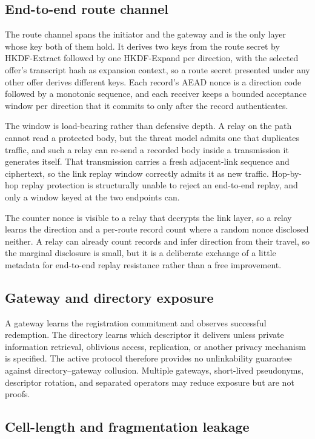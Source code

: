 \documentclass[11pt,oneside]{article}
\begin{document}
\subsection{End-to-end route channel}

The route channel spans the initiator and the gateway and is the only layer whose key both of them hold. It derives two keys from the route secret by HKDF-Extract followed by one HKDF-Expand per direction, with the selected offer's transcript hash as expansion context, so a route secret presented under any other offer derives different keys. Each record's AEAD nonce is a direction code followed by a monotonic sequence, and each receiver keeps a bounded acceptance window per direction that it commits to only after the record authenticates.

The window is load-bearing rather than defensive depth. A relay on the path cannot read a protected body, but the threat model admits one that duplicates traffic, and such a relay can re-send a recorded body inside a transmission it generates itself. That transmission carries a fresh adjacent-link sequence and ciphertext, so the link replay window correctly admits it as new traffic. Hop-by-hop replay protection is structurally unable to reject an end-to-end replay, and only a window keyed at the two endpoints can.

The counter nonce is visible to a relay that decrypts the link layer, so a relay learns the direction and a per-route record count where a random nonce disclosed neither. A relay can already count records and infer direction from their travel, so the marginal disclosure is small, but it is a deliberate exchange of a little metadata for end-to-end replay resistance rather than a free improvement.

\subsection{Gateway and directory exposure}

A gateway learns the registration commitment and observes successful redemption. The directory learns which descriptor it delivers unless private information retrieval, oblivious access, replication, or another privacy mechanism is specified. The active protocol therefore provides no unlinkability guarantee against directory--gateway collusion. Multiple gateways, short-lived pseudonyms, descriptor rotation, and separated operators may reduce exposure but are not proofs.

\subsection{Cell-length and fragmentation leakage}
\end{document}
